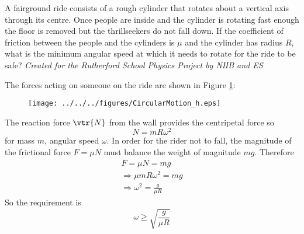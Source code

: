 
\begin{problem}
{A fairground ride consists of a rough cylinder that rotates about a vertical axis through its centre. Once people are inside and the cylinder is rotating fast enough the floor is removed but the thrillseekers do not fall down. If the coefficient of friction between the people and the cylinders is $\mu$ and the cylinder has radius $R$, what is the minimum angular speed at which it needs to rotate for the ride to be safe?
}
{\textit{Created for the Rutherford School Physics Project by NHB and ES}}
{The forces acting on someone on the ride are shown in Figure \ref{fig:CircularMotion_h}:
\begin{figure}[h]
\centering
\texttt{[image: ../../../figures/CircularMotion\_h.eps]}
\caption{}
\label{fig:CircularMotion_h}
\end{figure}
The reaction force $\vtr{N}$ from the wall provides the centripetal force so
\begin{equation*}
N=mR\omega^2
\end{equation*}
for mass $m$, angular speed $\omega$. In order for the rider not to fall, the magnitude of the frictional force $F=\mu N$ must balance the weight of magnitude $mg$. Therefore
\begin{align*}
F=\mu N=mg \\
\Rightarrow \mu mR\omega^2=mg \\
\Rightarrow \omega^2=\frac{g}{\mu R}
\end{align*}
So the requirement is 
\begin{equation*}
\omega\ge\sqrt{\frac{g}{\mu R}}
\end{equation*}
}
\end{problem}